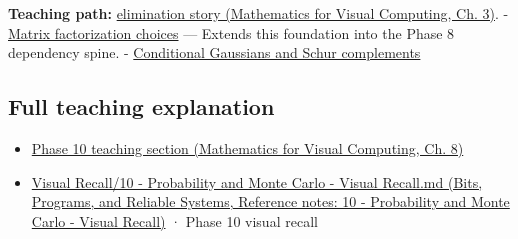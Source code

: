 \textbf{Teaching path:} \href{../02-Mathematics-for-Visual-Computing/main.pdf\#nameddest=01-foundations-i-ch019-elimination-turns-the-geometry-into-an-auditable-calculation}{elimination story (Mathematics for Visual Computing, Ch. 3)}. - \hyperref[appendix-221a483bec2d]{Matrix factorization choices} --- Extends this foundation into the Phase 8 dependency spine. - \hyperref[appendix-f0437ea55a47]{Conditional Gaussians and Schur complements}

\subsection{Full teaching explanation}\label{appendix-f6e77f4a200f-full-teaching-explanation}

\begin{itemize}
\tightlist
\item
  \href{../02-Mathematics-for-Visual-Computing/main.pdf\#nameddest=02-foundations-ii-ch024-waiting-times-event-counts-and-covariance-geometry}{Phase 10 teaching section (Mathematics for Visual Computing, Ch. 8)}
\item
  \href{../01-Bits-Programs-and-Reliable-Systems/main.pdf\#nameddest=appendix-cb5af353ef77}{Visual Recall/10 - Probability and Monte Carlo - Visual Recall.md (Bits, Programs, and Reliable Systems, Reference notes: 10 - Probability and Monte Carlo - Visual Recall)} · Phase 10 visual recall
\end{itemize}
